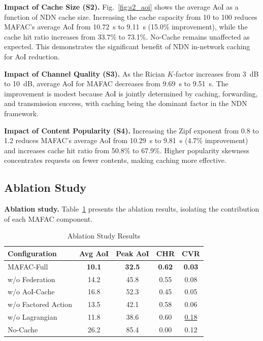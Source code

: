 \documentclass[journal]{IEEEtran}
\begin{document}
\textbf{Impact of Cache Size (S2).} Fig.~\ref{fig:s2_aoi} shows the average AoI as a function of NDN cache size. Increasing the cache capacity from 10 to 100 reduces MAFAC's average AoI from 10.72~s to 9.11~s (15.0\% improvement), while the cache hit ratio increases from 33.7\% to 73.1\%. No-Cache remains unaffected as expected. This demonstrates the significant benefit of NDN in-network caching for AoI reduction.


\textbf{Impact of Channel Quality (S3).} As the Rician $K$-factor increases from 3~dB to 10~dB, average AoI for MAFAC decreases from 9.69~s to 9.51~s. The improvement is modest because AoI is jointly determined by caching, forwarding, and transmission success, with caching being the dominant factor in the NDN framework.

\textbf{Impact of Content Popularity (S4).} Increasing the Zipf exponent from 0.8 to 1.2 reduces MAFAC's average AoI from 10.29~s to 9.81~s (4.7\% improvement) and increases cache hit ratio from 50.8\% to 67.9\%. Higher popularity skewness concentrates requests on fewer contents, making caching more effective.

\subsection{Ablation Study} \label{sec.s3}

\textbf{Ablation study.} Table~\ref{tab:ablation} presents the ablation results, isolating the contribution of each MAFAC component.

\begin{table}[!t]
\centering
\caption{Ablation Study Results}
\label{tab:ablation}
\begin{tabular}{l c c c c}
\toprule
\textbf{Configuration} & \textbf{Avg AoI} & \textbf{Peak AoI} & \textbf{CHR} & \textbf{CVR} \\
\midrule
MAFAC-Full           & \textbf{10.1} & \textbf{32.5} & \textbf{0.62} & \textbf{0.03} \\
w/o Federation       & 14.2          & 45.8          & 0.55          & 0.08 \\
w/o AoI-Cache        & 16.8          & 52.3          & 0.45          & 0.05 \\
w/o Factored Action  & 13.5          & 42.1          & 0.58          & 0.06 \\
w/o Lagrangian       & 11.8          & 38.6          & 0.60          & \underline{0.18} \\
No-Cache             & 26.2          & 85.4          & 0.00          & 0.12 \\
\bottomrule
\end{tabular}
\end{table}
\end{document}
